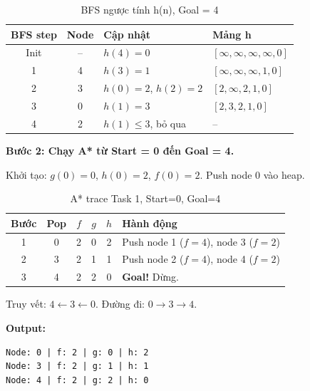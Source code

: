 \documentclass[13pt,a4paper]{article}
\begin{document}
\begin{table}[H]
\centering
\begin{tabular}{ccll}
\toprule
\textbf{BFS step} & \textbf{Node} & \textbf{Cập nhật} & \textbf{Mảng h} \\
\midrule
Init  & --  & $h(4) = 0$                 & $[\infty,\infty,\infty,\infty,0]$ \\
1     & 4   & $h(3) = 1$                 & $[\infty,\infty,\infty,1,0]$ \\
2     & 3   & $h(0) = 2$, $h(2) = 2$     & $[2,\infty,2,1,0]$ \\
3     & 0   & $h(1) = 3$                 & $[2,3,2,1,0]$ \\
4     & 2   & $h(1) \le 3$, bỏ qua       & -- \\
\bottomrule
\end{tabular}
\caption{BFS ngược tính h(n), Goal = 4}
\end{table}

\textbf{Bước 2: Chạy A* từ Start = 0 đến Goal = 4.}

Khởi tạo: $g(0)=0$, $h(0)=2$, $f(0)=2$. Push node 0 vào heap.

\begin{table}[H]
\centering
\begin{tabular}{cccccp{6cm}}
\toprule
\textbf{Bước} & \textbf{Pop} & $f$ & $g$ & $h$ & \textbf{Hành động} \\
\midrule
1 & 0 & 2 & 0 & 2 & Push node 1 ($f=4$), node 3 ($f=2$) \\
2 & 3 & 2 & 1 & 1 & Push node 2 ($f=4$), node 4 ($f=2$) \\
3 & 4 & 2 & 2 & 0 & \textbf{Goal!} Dừng. \\
\bottomrule
\end{tabular}
\caption{A* trace Task 1, Start=0, Goal=4}
\end{table}

Truy vết: $4 \leftarrow 3 \leftarrow 0$. Đường đi: $0 \to 3 \to 4$.

\textbf{Output:}
\begin{lstlisting}[language={}, numbers=none]
Node: 0 | f: 2 | g: 0 | h: 2
Node: 3 | f: 2 | g: 1 | h: 1
Node: 4 | f: 2 | g: 2 | h: 0
\end{lstlisting}
\end{document}
